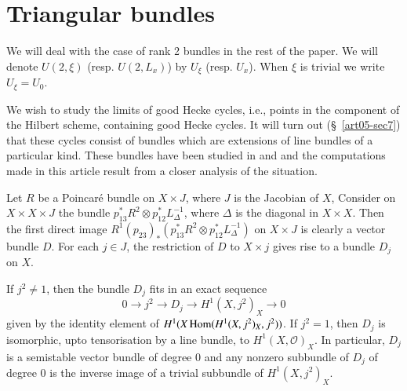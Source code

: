 \section{Triangular bundles}\label{art05-sec6}

We will deal with the case of rank 2 bundles in the rest of the
paper. We will denote $U(2,\xi)$ (resp. $U(2,L_{x})$) by $U_{\xi}$
(resp. $U_{x}$). When $\xi$ is trivial we write $U_{\xi}=U_{0}$.

We wish to study the limits of good Hecke cycles, i.e., points in the
component of the Hilbert scheme, containing good Hecke cycles. It will
turn out (\S\ \ref{art05-sec7}) that these cycles consist of bundles
which are extensions of line bundles of a particular kind. These
bundles have been studied in \cite{art05-key6} and \cite{art05-key8}
and the computations made in this article result from a closer
analysis of the situation.

Let $R$ be a Poincar\'e bundle on $X\times J$, where $J$ is the
Jacobian of $X$, Consider on $X\times X\times J$ the bundle
$p^{*}_{13}R^{2}\otimes p^{*}_{12}L_{\Delta}^{-1}$, where $\Delta$ is
the diagonal in $X\times X$. Then the first direct image
$R^{1}(p_{23})_{*}(p^{*}_{13}R^{2}\otimes p^{*}_{12}L^{-1}_{\Delta})$
on $X\times J$ is clearly a vector bundle $D$. For each $j\in J$, the
restriction of $D$ to $X\times j$ gives rise to a bundle $D_{j}$ on
$X$.

\begin{lemma}\label{art05-lem6.1}
If $j^{2}\neq 1$, then the bundle $D_{j}$ fits in an exact sequence
$$
0\to j^{2}\to D_{j}\to H^{1}(X,j^{2})_{X}\to 0
$$
given by the identity element of $H^{1}(X\operatorname{Hom}
(H^{1}(X,j^{2})_{X},j^{2}))$. If $j^{2}=1$, then $D_{j}$ is
isomorphic, upto tensorisation by a line bundle, to
$H^{1}(X,\mathscr{O})_{X}$. In particular, $D_{j}$ is a semistable
vector bundle of degree $0$ and any nonzero subbundle of $D_{j}$ of
degree $0$ is the inverse image of a trivial subbundle of
$H^{1}(X,j^{2})_{X}$. 
\end{lemma}


